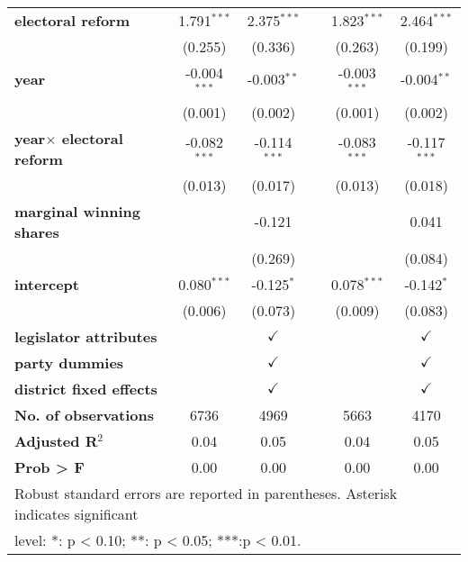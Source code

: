 \begin{table}[h]
{\begin{tabular}{lccccc}
\textbf{electoral reform}   & 1.79{1$^{***}$}   & 2.375{$^{***}$}   &          & {1.823$^{***}$} & {2.464$^{***}$}  \\
                            & (0.255)           & (0.336)           &          & (0.263)         & (0.199)          \\
\textbf{year}               & -0.0{04$^{***}$}  & -0.0{03$^{**}$}   &          & -0{.003$^{***}$}& {-0.004$^{**}$}  \\
                            & (0.001)           & (0.002)           &          & (0.001)         & (0.002)          \\
\textbf{year$\times$ electoral reform}  & -0.{082$^{***}$} & {-0.114$^{***}$} &         & {-0.083$^{***}$} & -0.11{7$^{***}$} \\
                                        & (0.013)          & (0.017)          &         & (0.013)          & (0.018)\\
\textbf{marginal winning shares}        &                  & -0.121           &         &                  & 0.041\\
                                        &                  & (0.269)          &         &                  & (0.084)\\
\textbf{intercept}                      & 0.0{80$^{***}$}  & -0.125{$^{*}$}   &         & 0.07{8$^{***}$} & -0.142{$^{*}$}\\
                                        & (0.006)          & (0.073)          &         & (0.009)         & (0.083)\\
\textbf{legislator attributes}          &                  & $\checkmark$     &         &                 & $\checkmark$\\
\textbf{party dummies}                  &                  & $\checkmark$     &         &                 & $\checkmark$\\
\textbf{district fixed effects}         &                  & $\checkmark$     &         &                 & $\checkmark$\\
\midrule
\textbf{No. of observations}            & 6736             & 4969             &         & 5663            & 4170\\
\textbf{Adjusted R$^{2}$}               & 0.04             & 0.05             &         & 0.04            & 0.05\\
\textbf{Prob > F} & 0.00 & 0.00 &  & 0.00 & 0.00\\
\midrule
\multicolumn{6}{l}{{Robust standard errors are reported in parentheses. Asterisk indicates significant }}\tabularnewline
\multicolumn{6}{l}{{level: {*}: p < 0.10;
{*}{*}: p < 0.05; {*}{*}{*}:p < 0.01.}}\tabularnewline
\end{tabular}}
\end{table}